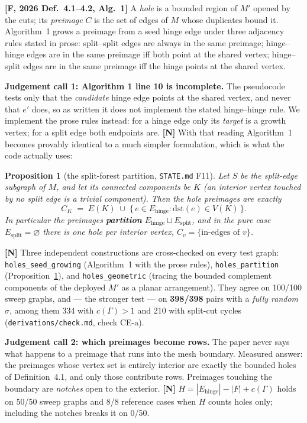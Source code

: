 \documentclass[11pt,a4paper]{article}
\newtheorem{proposition}[theorem]{Proposition}
\theoremstyle{definition}
\newcommand{\Esplit}{E_{\mathrm{split}}}
\newcommand{\Ehinge}{E_{\mathrm{hinge}}}
\newcommand{\Mprime}{M'}
\newcommand{\file}[1]{\texttt{\small #1}}
\begin{document}
\textbf{[F, 2026 Def.~4.1--4.2, Alg.~1]} A \emph{hole} is a bounded region of $\Mprime$
opened by the cuts; its \emph{preimage} $C$ is the set of edges of $M$ whose duplicates
bound it. Algorithm~1 grows a preimage from a seed hinge edge under three adjacency rules
stated in prose: split--split edges are always in the same preimage; hinge--hinge edges are
in the same preimage iff both point at the shared vertex; hinge--split edges are in the same
preimage iff the hinge points at the shared vertex.

\textbf{Judgement call 1: Algorithm 1 line 10 is incomplete.} The pseudocode tests only that
the \emph{candidate} hinge edge points at the shared vertex, and never that $e'$ does, so as
written it does not implement the stated hinge--hinge rule. We implement the prose rules
instead: for a hinge edge only its \emph{target} is a growth vertex; for a split edge both
endpoints are. \textbf{[N]} With that reading Algorithm~1 becomes provably identical to a
much simpler formulation, which is what the code actually uses:

\begin{proposition}[the split-forest partition, \file{STATE.md} F11]
\label{prop:f11}
Let $S$ be the split-edge subgraph of $M$, and let its connected components be $K$ (an
interior vertex touched by no split edge is a trivial component). Then the hole preimages
are exactly
\[
C_K \;=\; E(K)\;\cup\;\{\, e\in\Ehinge : \mathrm{dst}(e)\in V(K) \,\}.
\]
In particular the preimages \textbf{partition} $\Ehinge\sqcup\Esplit$, and in the pure case
$\Esplit=\varnothing$ there is one hole per interior vertex, $C_v=\{\text{in-edges of }v\}$.
\end{proposition}

\noindent
\textbf{[N]} Three independent constructions are cross-checked on every test graph:
\file{holes\_seed\_growing} (Algorithm~1 with the prose rules), \file{holes\_partition}
(Proposition~\ref{prop:f11}), and \file{holes\_geometric} (tracing the bounded complement
components of the deployed $\Mprime$ as a planar arrangement). They agree on 100/100 sweep
graphs, and --- the stronger test --- on \textbf{398/398} pairs with a \emph{fully random}
$\sigma$, among them 334 with $c(\Gamma)>1$ and 210 with split-cut cycles
(\file{derivations/check.md}, check CE-a).

\textbf{Judgement call 2: which preimages become rows.} The paper never says what happens to
a preimage that runs into the mesh boundary. Measured answer: the preimages whose vertex set
is entirely interior are exactly the bounded holes of Definition~4.1, and only those
contribute rows. Preimages touching the boundary are \emph{notches} open to the exterior.
\textbf{[N]} $H = |\Ehinge| - |F| + c(\Gamma)$ holds on 50/50 sweep graphs and 8/8 reference
cases when $H$ counts holes only; including the notches breaks it on 0/50.
\end{document}
